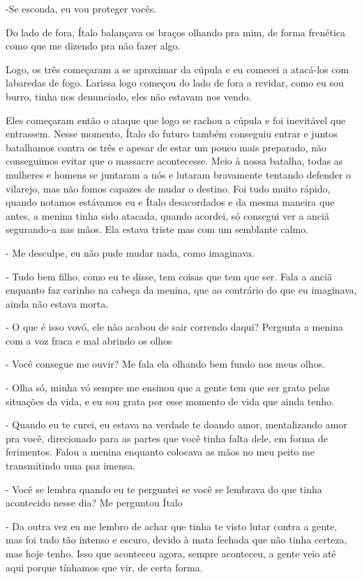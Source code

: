 -Se esconda, eu vou proteger vocês.

Do lado de fora, Ítalo balançava os braços olhando pra mim, de forma frenética como que me dizendo pra não fazer algo.

Logo, os três começaram a se aproximar da cúpula e eu comecei a atacá-los com labaredas de fogo. Larissa logo começou do lado de fora a revidar, como eu sou burro, tinha nos denunciado, eles não estavam nos vendo.

Eles começaram então o ataque que logo se rachou a cúpula e foi inevitável que entrassem. Nesse momento, Ítalo do futuro também conseguiu entrar e juntos batalhamos contra os três e apesar de estar um pouco mais preparado, não conseguimos evitar que o massacre acontecesse. Meio à nossa batalha, todas as mulheres e homens se juntaram a nós e lutaram bravamente tentando defender o vilarejo, mas não fomos capazes de mudar o destino. Foi tudo muito rápido, quando notamos estávamos eu e Ítalo desacordados e da mesma maneira que antes, a menina tinha sido atacada, quando acordei, só consegui ver a anciã segurando-a nas mãos. Ela estava triste mas com um semblante calmo.

- Me desculpe, eu não pude mudar nada, como imaginava.

- Tudo bem filho, como eu te disse, tem coisas que tem que ser. Fala a anciã enquanto faz carinho na cabeça da menina, que ao contrário do que eu imaginava, ainda não estava morta.

- O que é isso vovó, ele não acabou de sair correndo daqui? Pergunta a menina com a voz fraca e mal abrindo os olhos

- Você consegue me ouvir? Me fala ela olhando bem fundo nos meus olhos.

- Olha só, minha vó sempre me ensinou que a gente tem que ser grato pelas situações da vida, e eu sou grata por esse momento de vida que ainda tenho.

- Quando eu te curei, eu estava na verdade te doando amor, mentalizando amor pra você, direcionado para as partes que você tinha falta dele, em forma de ferimentos. Falou a menina enquanto colocava as mãos no meu peito me transmitindo uma paz imensa.

- Você se lembra quando eu te perguntei se você se lembrava do que tinha acontecido nesse dia? Me perguntou Ítalo

- Da outra vez eu me lembro de achar que tinha te visto lutar contra a gente, mas foi tudo tão intenso e escuro, devido à mata fechada que não tinha certeza, mas hoje tenho. Isso que aconteceu agora, sempre aconteceu, a gente veio até aqui porque tínhamos que vir, de certa forma.

